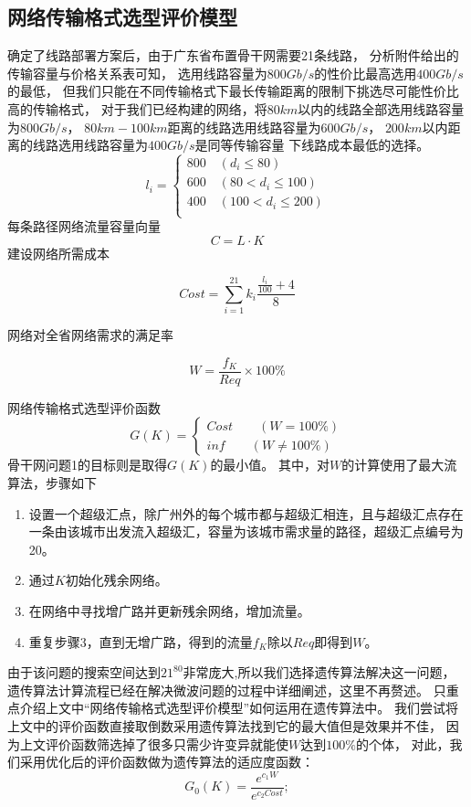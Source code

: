 \documentclass[UTF8,12pt]{ctexart}
\begin{document}
    \subsection{网络传输格式选型评价模型}\label{WLCSGS}
    确定了线路部署方案后，由于广东省布置骨干网需要21条线路，
    分析附件给出的传输容量与价格关系表可知，
    选用线路容量为$800Gb/s$的性价比最高选用$400Gb/s$的最低，
    但我们只能在不同传输格式下最长传输距离的限制下挑选尽可能性价比高的传输格式，
    对于我们已经构建的网络，将$80km$以内的线路全部选用线路容量为$800Gb/s$，
    $80km-100km$距离的线路选用线路容量为$600Gb/s$，
    $200km$以内距离的线路选用线路容量为$400Gb/s$是同等传输容量
    下线路成本最低的选择。$$l_i=\begin{cases}
        800\quad (d_i\leqslant 80) \\
        600\quad  (80<d_i\leqslant 100)\\
        400\quad  (100<d_i\leqslant 200) \\
     \end{cases} $$
     每条路径网络流量容量向量$$C=L·K$$
     建设网络所需成本
     \begin{large}
         $$Cost=\sum_{i=1}^{21}k_i\frac{\frac{l_i}{100}+4}{8}$$
     \end{large}
     网络对全省网络需求的满足率
     \begin{large}
         $$W=\frac{f_K}{Req}×100\%$$
     \end{large}
     网络传输格式选型评价函数$$G(K)=\begin{cases}
         Cost \quad \quad (W=100\%)\\
         inf  \quad \quad (W\not=100\%)
     \end{cases}
     $$
     骨干网问题1的目标则是取得$G(K)$的最小值。
     其中，对$W$的计算使用了最大流算法，步骤如下
     \begin{enumerate}
        \item 设置一个超级汇点，除广州外的每个城市都与超级汇相连，且与超级汇点存在一条由该城市出发流入超级汇，容量为该城市需求量的路径，超级汇点编号为20。
        \item 通过$K$初始化残余网络。
        \item 在网络中寻找增广路并更新残余网络，增加流量。
        \item 重复步骤3，直到无增广路，得到的流量$f_K$除以$Req$即得到$W$。
     \end{enumerate}
     
     由于该问题的搜索空间达到$21^{80}$非常庞大,所以我们选择遗传算法解决这一问题，
     遗传算法计算流程已经在解决微波问题的过程中详细阐述，这里不再赘述。
     只重点介绍上文中“网络传输格式选型评价模型”如何运用在遗传算法中。
     我们尝试将上文中的评价函数直接取倒数采用遗传算法找到它的最大值但是效果并不佳，
     因为上文评价函数筛选掉了很多只需少许变异就能使$W$达到$100\%$的个体，
     对此，我们采用优化后的评价函数做为遗传算法的适应度函数：
     $$G_0(K)=\frac{e^{c_1W}}{e^{c_2Cost}};$$
\end{document}
